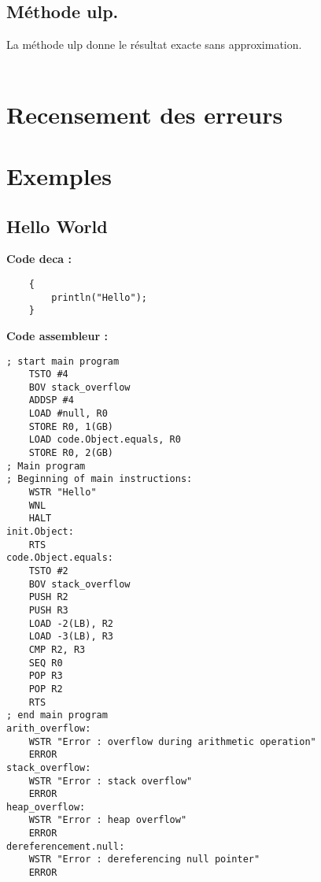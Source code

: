 \documentclass[a4,12pt]{article}
\begin{document}
\subsection{Méthode ulp.}
La méthode ulp donne le résultat exacte sans approximation.\\
\\

\section{Recensement des erreurs}

\section{Exemples}
\subsection{Hello World}

\textbf{Code deca :} 
\begin{verbatim}
	{
        println("Hello");
	}
\end{verbatim}
\textbf{Code assembleur :} 
\begin{verbatim}
; start main program
	TSTO #4
	BOV stack_overflow
	ADDSP #4
	LOAD #null, R0
	STORE R0, 1(GB)
	LOAD code.Object.equals, R0
	STORE R0, 2(GB)
; Main program
; Beginning of main instructions:
	WSTR "Hello"
	WNL
	HALT
init.Object:
	RTS
code.Object.equals:
	TSTO #2
	BOV stack_overflow
	PUSH R2
	PUSH R3
	LOAD -2(LB), R2
	LOAD -3(LB), R3
	CMP R2, R3
	SEQ R0
	POP R3
	POP R2
	RTS
; end main program
arith_overflow:
	WSTR "Error : overflow during arithmetic operation"
	ERROR
stack_overflow:
	WSTR "Error : stack overflow"
	ERROR
heap_overflow:
	WSTR "Error : heap overflow"
	ERROR
dereferencement.null:
	WSTR "Error : dereferencing null pointer"
	ERROR
\end{verbatim}
\end{document}
